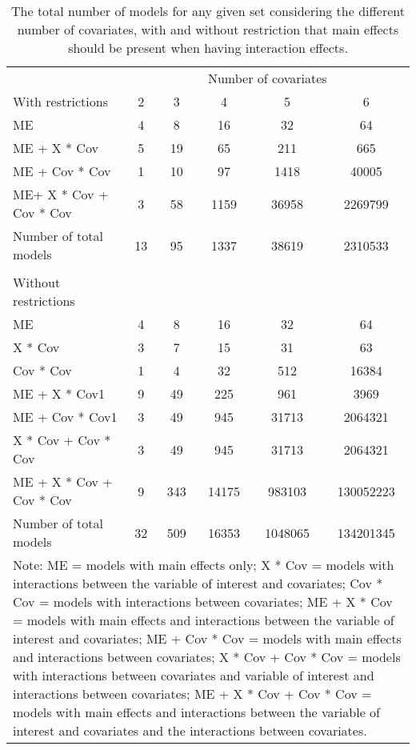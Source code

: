 \begin{table}[!h]
\centering
\caption{The total number of models for any given set considering the different number of covariates, with and without restriction that main effects should be present when having interaction effects.} 
\begin{tabular}{lccccc}
  \hline
  & \multicolumn{5}{c}{Number of covariates} \\
With restrictions & 2 & 3 & 4 & 5 & 6 \\ 
  \hline
ME & 4 & 8 & 16 & 32 & 64 \\ 
  ME + X * Cov & 5 & 19 & 65 & 211 & 665 \\ 
  ME + Cov * Cov & 1 & 10 & 97 & 1418 & 40005 \\ 
  ME+ X * Cov + Cov * Cov & 3 & 58 & 1159 & 36958 & 2269799 \\
  \hline 
  Number of total models & 13 & 95 & 1337 & 38619 & 2310533 \\ 
  \hline \\
  Without restrictions \\ 
  \hline
  ME & 4 & 8 & 16 & 32 & 64 \\ 
  X * Cov & 3 & 7 & 15 & 31 & 63 \\ 
  Cov * Cov & 1 & 4 & 32 & 512 & 16384 \\ 
  ME + X * Cov1 & 9 & 49 & 225 & 961 & 3969 \\ 
  ME + Cov * Cov1 & 3 & 49 & 945 & 31713 & 2064321 \\ 
  X * Cov + Cov * Cov & 3 & 49 & 945 & 31713 & 2064321 \\ 
  ME + X * Cov + Cov * Cov & 9 & 343 & 14175 & 983103 & 130052223 \\ 
  \hline
  Number of total models & 32 & 509 & 16353 & 1048065 & 134201345 \\ 
   \hline 
\multicolumn{6}{p{13cm}}{\footnotesize{Note: ME = models with main effects only; X * Cov = models with interactions between the variable of interest and covariates; Cov * Cov = models with interactions between covariates;  ME + X * Cov = models with main effects and interactions between the variable of interest and covariates; ME + Cov * Cov = models with main effects and interactions between covariates; X * Cov + Cov * Cov = models with interactions between covariates and variable of interest and interactions between covariates; ME + X * Cov + Cov * Cov = models with main effects and interactions between the variable of interest and covariates and the interactions between covariates.}} 

\end{tabular}
\end{table}

